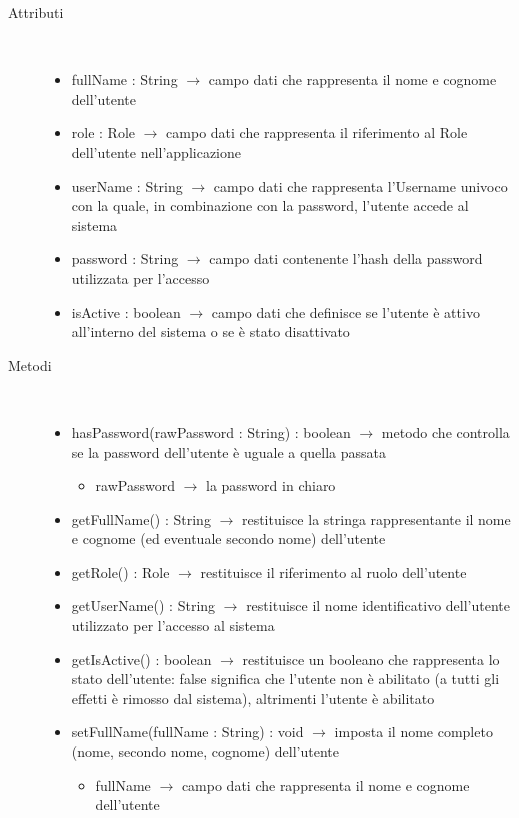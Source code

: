 \begin{description}
\item[Attributi] \hfill \\
\vspace{-7mm}
\begin{itemize}
	\item fullName : String $\rightarrow$ campo dati che rappresenta il nome e cognome dell'utente
	\item role : Role $\rightarrow$ campo dati che rappresenta il riferimento al Role dell'utente nell'applicazione
	\item userName : String $\rightarrow$ campo dati che rappresenta l'Username univoco con la quale, in combinazione con la password, l'utente accede al sistema
	\item password : String $\rightarrow$ campo dati contenente l'hash della password utilizzata per l'accesso
	\item isActive : boolean $\rightarrow$ campo dati che definisce se l'utente è attivo all'interno del sistema o se è stato disattivato
\end{itemize}

\item[Metodi] \hfill \\
\vspace{-7mm}
\begin{itemize}
	\item hasPassword(rawPassword : String) : boolean $\rightarrow$ metodo che controlla se la password dell'utente è uguale a quella passata\begin{itemize}
		\item rawPassword $\rightarrow$ la password in chiaro
	\end{itemize}
	
	\item getFullName() : String $\rightarrow$ restituisce la stringa rappresentante il nome e cognome (ed eventuale secondo nome) dell'utente
	\item getRole() : Role $\rightarrow$ restituisce il riferimento al ruolo dell'utente
	\item getUserName() : String $\rightarrow$ restituisce il nome identificativo dell'utente utilizzato per l'accesso al sistema
	\item getIsActive() : boolean $\rightarrow$ restituisce un booleano che rappresenta lo stato dell'utente: false significa che l'utente non è abilitato (a tutti gli effetti è rimosso dal sistema), altrimenti l'utente è abilitato
	\item setFullName(fullName : String) : void $\rightarrow$ imposta il nome completo (nome, secondo nome, cognome) dell'utente\begin{itemize}
		\item fullName $\rightarrow$ campo dati che rappresenta il nome e cognome dell'utente
	\end{itemize}
	

\end{itemize}
\end{description}

